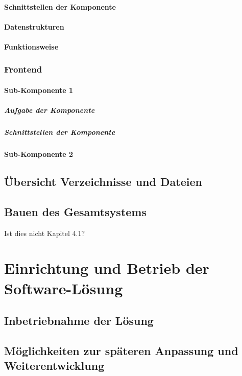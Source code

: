 \documentclass[a4paper,11pt,DIV=12,overfullrule=on]{scrreprt}
\begin{document}
\subsubsection{Schnittstellen der Komponente}
\subsubsection{Datenstrukturen}
\subsubsection{Funktionsweise}
\subsection{Frontend}
\subsubsection{Sub-Komponente 1}
\paragraph{Aufgabe der Komponente}
\paragraph{Schnittstellen der Komponente}
\subsubsection{Sub-Komponente 2}
\section{Übersicht Verzeichnisse und Dateien}
\section{Bauen des Gesamtsystems}
Ist dies nicht Kapitel 4.1?


\chapter{Einrichtung und Betrieb der Software-Lösung}
\section{Inbetriebnahme der Lösung}
\section{Möglichkeiten zur späteren Anpassung und Weiterentwicklung}
\end{document}
